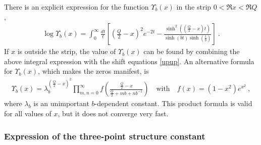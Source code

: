 \documentclass[12pt, a4paper, notitlepage, twoside]{report}
\numberwithin{equation}{section}
\theoremstyle{break}
\begin{document}
There is an explicit expression for the function $\Upsilon_b(x)$ in the strip $0<\Re x<\Re Q$, 
\begin{align}
 \log\Upsilon_b(x) = \int_0^\infty \frac{dt}{t} \left[\left(\tfrac{Q}{2}-x\right)^2 e^{-2t} -\frac{\sinh^2\left(\left(\frac{Q}{2}-x\right)\!t\right)}{\sinh (bt)\sinh\left(\frac{t}{b}\right)}\right]\ .
\label{lup}
\end{align}
If $x$ is outside the strip, the value of $\Upsilon_b(x)$ can be found by combining the above integral expression with the shift equations \eqref{upup}.
An alternative formula for $\Upsilon_b(x)$, which makes the zeros manifest, is 
\begin{align}
 \Upsilon_b(x) = \lambda_b^{(\frac{Q}{2}-x)^2}\prod_{m,n=0}^\infty f\left(\frac{\frac{Q}{2}-x}{\frac{Q}{2}+mb+nb^{-1}}\right) \quad \text{with} \quad f(x)=(1-x^2)e^{x^2}\ ,
\end{align}
where $\lambda_b$ is an unimportant $b$-dependent constant.
This product formula is valid for all values of $x$, but it does not converge very fast.

\subsubsection{Expression of the three-point structure constant}
\end{document}
